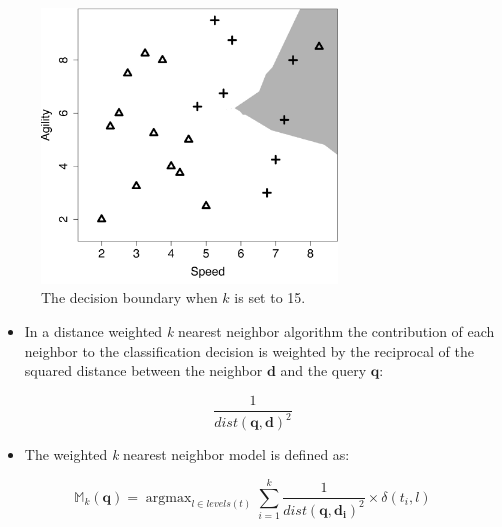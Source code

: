 \documentclass[xcolor={table}]{beamer}
\DeclareMathOperator*{\argmax}{argmax}
\begin{document}
 \begin{frame} 
\begin{figure}[htb]
       \begin{centering}
       \includegraphics[width=0.7\textwidth]{images/knn_fs_9_small.pdf}
       \caption{The decision boundary when $k$ is set to 15.}
       \label{fig:bigk}
       \end{centering}
\end{figure}
\end{frame} 


\begin{frame} 
\begin{itemize}
\item In a distance \alert{weighted \textit{k} nearest neighbor} algorithm the contribution of each neighbor to the classification decision is weighted by the reciprocal of the squared distance between the neighbor $\textbf{d}$ and the query $\textbf{q}$:
\end{itemize}
\begin{center} 
\begin{equation}
 \frac{1}{dist(\mathbf{q}, \mathbf{d})^2}
\label{eq:reciprocalsquaredist}
\end{equation}
\end{center}
\begin{itemize}
\item The weighted \textit{k} nearest neighbor model is defined as: 
\end{itemize}
\begin{equation}
\mathbb{M}_{k}(\mathbf{q}) = \argmax_{l \in levels(t)} \sum_{i=1}^k \frac{1}{dist(\mathbf{q}, \mathbf{d_i})^2} \times \delta(t_i,l) 
\label{eq:weightedknn}
\end{equation}
\end{frame} 
\end{document}

